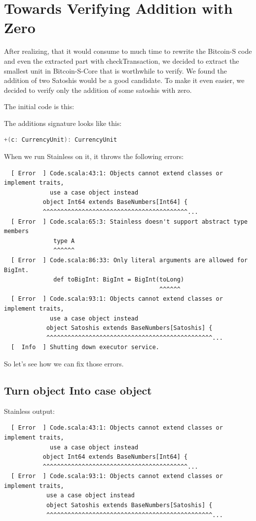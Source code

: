 \chapter{Towards Verifying Addition with Zero}
\label{chap:verify_add}

After realizing, that it would consume to much time to rewrite the Bitcoin-S code and even the extracted part with checkTransaction, we decided to extract the smallest unit in Bitcoin-S-Core that is worthwhile to verify.
We found the addition of two Satoshis would be a good candidate.
To make it even easier, we decided to verify only the addition of some satoshis with zero.

The initial code is this:


The additions signature looks like this:
\begin{lstlisting}[language=scala]
  +(c: CurrencyUnit): CurrencyUnit
\end{lstlisting}

When we run Stainless on it, it throws the following errors:
{\footnotesize\begin{verbatim}
  [ Error  ] Code.scala:43:1: Objects cannot extend classes or implement traits,
             use a case object instead
           object Int64 extends BaseNumbers[Int64] {
           ^^^^^^^^^^^^^^^^^^^^^^^^^^^^^^^^^^^^^^^^^...
  [ Error  ] Code.scala:65:3: Stainless doesn't support abstract type members
              type A
              ^^^^^^
  [ Error  ] Code.scala:86:33: Only literal arguments are allowed for BigInt.
              def toBigInt: BigInt = BigInt(toLong)
                                            ^^^^^^
  [ Error  ] Code.scala:93:1: Objects cannot extend classes or implement traits,
             use a case object instead
            object Satoshis extends BaseNumbers[Satoshis] {
            ^^^^^^^^^^^^^^^^^^^^^^^^^^^^^^^^^^^^^^^^^^^^^^^...
  [  Info  ] Shutting down executor service.
\end{verbatim}}

So let's see how we can fix those errors.


\section{Turn object Into case object}

Stainless output:
{\footnotesize\begin{verbatim}
  [ Error  ] Code.scala:43:1: Objects cannot extend classes or implement traits,
             use a case object instead
           object Int64 extends BaseNumbers[Int64] {
           ^^^^^^^^^^^^^^^^^^^^^^^^^^^^^^^^^^^^^^^^^...
  [ Error  ] Code.scala:93:1: Objects cannot extend classes or implement traits,
            use a case object instead
            object Satoshis extends BaseNumbers[Satoshis] {
            ^^^^^^^^^^^^^^^^^^^^^^^^^^^^^^^^^^^^^^^^^^^^^^^...
\end{verbatim}}

